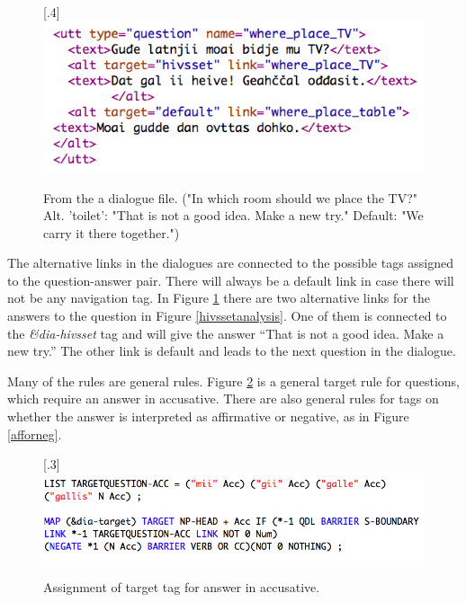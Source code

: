 \documentclass[11pt]{article}
\begin{document}
\begin{figure}[htbp]
\begin{center}
\scalebox{.4}[.4]{\includegraphics{presentation/img/whereTV.png}}\\
\caption{From the a dialogue file. ("In which room should we place the TV?" Alt. 'toilet': "That is not a good idea. Make a new try." Default: "We carry it there together.") 
}
\label{altlinks}
\end{center}
\end{figure}

The alternative links in the dialogues are connected to the possible tags assigned to the question-answer pair. There will always be a default link in case there will not be any navigation tag. In Figure \ref{altlinks} there are two alternative links for the answers to the question in Figure \ref{hivssetanalysis}. One of them is connected to the \textit{\&dia-hivsset} tag and will give the answer “That is not a good idea. Make a new try.” The other link is default and leads to the next question in the dialogue. 

Many of the rules are general rules. Figure \ref{targettag} is a general target rule for questions, which require an answer in accusative. There are also general rules for tags on whether the answer is interpreted as affirmative or negative, as in Figure \ref{afforneg}. \\
 
\begin{figure}[htbp]
\begin{center}
\scalebox{.3}[.3]{\includegraphics{presentation/img/target_acc.png}}\\
\caption{Assignment of target tag for answer in accusative. 
}
\label{targettag}
\end{center}
\end{figure}
\end{document}
